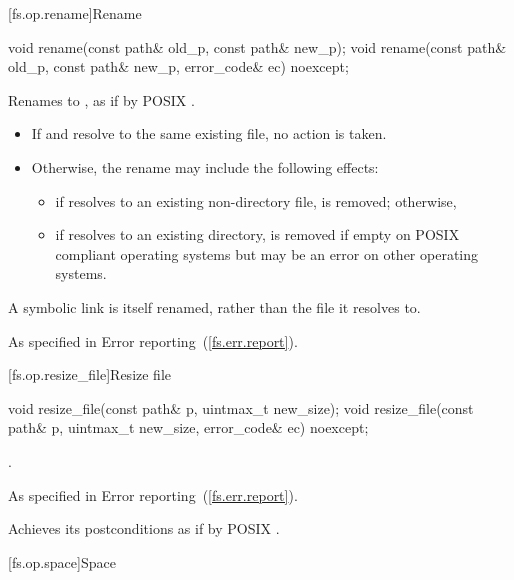 [fs.op.rename]{Rename}

\begin{itemdecl}
void rename(const path& old_p, const path& new_p);
void rename(const path& old_p, const path& new_p, error_code& ec) noexcept;
\end{itemdecl}

\begin{itemdescr}
\pnum
\effects Renames  to , as if by
  POSIX .
\begin{note}
\begin{itemize}
\item If  and  resolve to the same existing file,
   no action is taken.
\item Otherwise, the rename may include the following effects:
\begin{itemize}
\item if  resolves to an existing non-directory file,
     is removed; otherwise,
\item if  resolves to an existing directory,
     is removed if empty on POSIX compliant operating systems
    but may be an error on other operating systems.
\end{itemize}
\end{itemize}
A symbolic link is itself renamed, rather than the file it resolves to.
\end{note}

\pnum
\throws As specified in Error reporting~(\ref{fs.err.report}).
\end{itemdescr}


[fs.op.resize_file]{Resize file}

\begin{itemdecl}
void resize_file(const path& p, uintmax_t new_size);
void resize_file(const path& p, uintmax_t new_size, error_code& ec) noexcept;
\end{itemdecl}

\begin{itemdescr}
\pnum
\postcondition {}.

\pnum
\throws As specified in Error reporting~(\ref{fs.err.report}).

\pnum
\remarks Achieves its postconditions as if by POSIX .
\end{itemdescr}


[fs.op.space]{Space}

